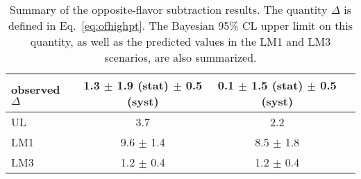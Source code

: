 \begin{table}[hbt]
\begin{center}
\caption{\label{tab:ofresults} 
Summary of the opposite-flavor subtraction results. The quantity $\Delta$ is defined in Eq.~\ref{eq:ofhighpt}.
The Bayesian 95\% CL upper limit on this quantity, as well as the predicted values in the LM1 and LM3 scenarios,
are also summarized.
}
\begin{tabular}{|l|c|c|c}

\hline
observed $\Delta$              &   1.3 $\pm$ 1.9 (stat) $\pm$ 0.5 (syst)  & 0.1 $\pm$ 1.5 (stat) $\pm$ 0.5 (syst) \\
\hline
UL                             &                  3.7                     &             2.2                       \\
LM1                            &              9.6 $\pm$ 1.4               &         8.5 $\pm$ 1.8                 \\
LM3                            &              1.2 $\pm$ 0.4               &         1.2 $\pm$ 0.4                 \\
\hline
\end{tabular}
\end{center}
\end{table}
